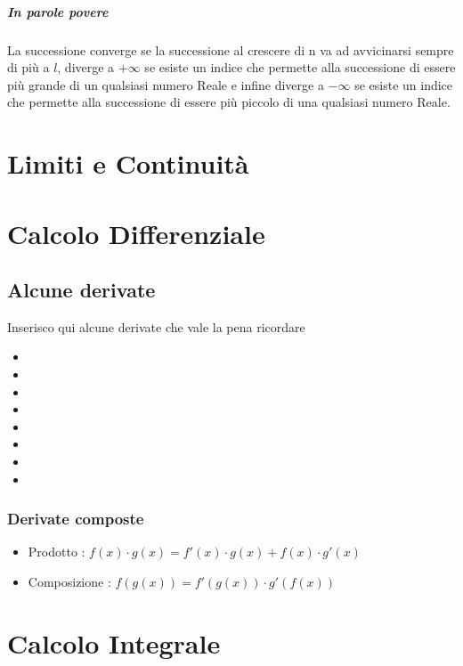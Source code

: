\documentclass[12pt, a4paper, openany]{book}
\begin{document}
\paragraph*{In parole povere} La successione converge se la successione al crescere di n va ad avvicinarsi sempre di più a $l$,
diverge a $+\infty$ se esiste un indice che permette alla successione di essere più grande di un qualsiasi numero Reale
e infine diverge a $-\infty$ se esiste un indice che permette alla successione di essere più piccolo di una qualsiasi numero Reale.
\chapter{Limiti e Continuità}
\chapter{Calcolo Differenziale}
\section{Alcune derivate}
Inserisco qui alcune derivate che vale la pena ricordare
\begin{itemize}
    \item {}
    \item {}
    \item {}
    \item {}
    \item {}
    \item {}
    \item {}
    \item {}
\end{itemize}
\subsection{Derivate composte}
\begin{itemize}
    \item Prodotto : $f(x) \cdot g(x) = f'(x) \cdot g(x) + f(x) \cdot g'(x)$
    \item Composizione : $f(g(x)) = f'(g(x)) \cdot g'(f(x))$
\end{itemize}
\chapter{Calcolo Integrale}
\end{document}
